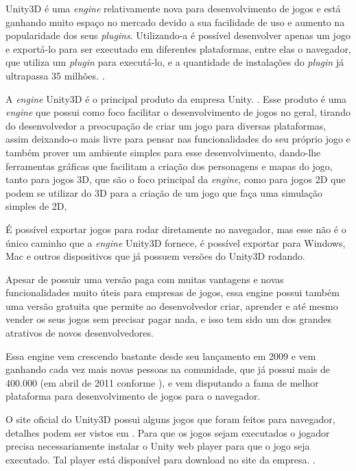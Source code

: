 Unity3D é uma \textit{engine} relativamente nova para desenvolvimento de jogos e está
ganhando muito espaço no mercado devido a sua facilidade de uso e
aumento na popularidade dos seus \textit{plugins}. Utilizando-a é possível
desenvolver apenas um jogo e exportá-lo para ser executado em
diferentes plataformas, entre elas o navegador, que utiliza um
\textit{plugin} para executá-lo, e a quantidade de instalações do \textit{plugin} já
ultrapassa 35 milhões. \cite{blackman2011beginning}.

A \textit{engine} Unity3D é o principal produto da empresa
Unity. \cite{website:unity3dcompany}. Esse produto é uma \textit{engine}
que possui como foco facilitar o desenvolvimento de jogos no
geral, tirando do desenvolvedor a preocupação de criar um jogo para
diversas plataformas, assim deixando-o mais livre para pensar nas
funcionalidades do seu próprio jogo e também prover um ambiente
simples para esse desenvolvimento, dando-lhe ferramentas gráficas que
facilitam a criação dos personagens e mapas do jogo, tanto para jogos
3D, que são o foco principal da \textit{engine}, como para jogos 2D
que podem se utilizar do 3D para a criação de um jogo que faça uma
simulação simples de 2D,

É possível exportar jogos para rodar diretamente no navegador, mas
esse não é o único caminho que a \textit{engine} Unity3D fornece, é possível exportar
para Windows, Mac e outros dispositivos que já possuem versões do
Unity3D rodando.

Apesar de possuir uma versão paga com muitas vantagens e novas
funcionalidades muito úteis para empresas de jogos, essa engine possui
também uma versão gratuita que permite ao desenvolvedor criar,
aprender e até mesmo vender os seus jogos sem precisar pagar nada, e
isso tem sido um dos grandes atrativos de novos desenvolvedores.

Essa engine vem crescendo bastante desde seu lançamento em 2009 e vem ganhando
cada vez mais novas pessoas na comunidade, que já possui mais de
400.000 (em abril de 2011 conforme
), e vem disputando a fama de melhor plataforma
para desenvolvimento de jogos para o navegador.

O site oficial do Unity3D possui alguns jogos que foram feitos para
navegador, detalhes podem ser vistos em .
Para que os jogos sejam executados o jogador precisa
necessariamente instalar o Unity web player para que o jogo seja executado.
Tal player está disponível para download no site da empresa. \cite{website:unity3dwebplayer}.

